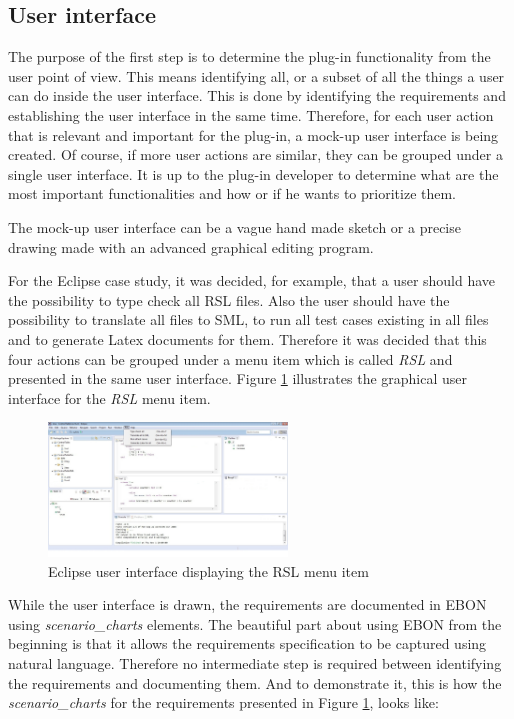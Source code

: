 \documentclass[conference]{IEEEtran}
\begin{document}
%
\subsection{User interface}

The purpose of the first step is to determine the plug-in
functionality from the user point of view. This means identifying all,
or a subset of all the things a user can do inside the user interface.
This is done by identifying the requirements and establishing the user
interface in the same time. Therefore, for each user action that is
relevant and important for the plug-in, a mock-up user interface is
being created. Of course, if more user actions are similar, they can
be grouped under a single user interface. It is up to the plug-in
developer to determine what are the most important functionalities and
how or if he wants to prioritize them.

The mock-up user interface can be a vague hand made sketch or a
precise drawing made with an advanced graphical editing program.

For the Eclipse case study, it was decided, for example, that a user
should have the possibility to type check all RSL files. Also the user
should have the possibility to translate all files to SML, to run all
test cases existing in all files and to generate Latex documents for
them. Therefore it was decided that this four actions can be grouped
under a menu item which is called \emph{RSL} and presented in the same
user interface. Figure \ref{UIMenu} illustrates the graphical user
interface for the \emph{RSL} menu item.

\begin{figure}[!t] \centering
\includegraphics[width=2.5in]{RSLMenu.jpeg} 
\caption{Eclipse user interface displaying the RSL menu item} 
\label{UIMenu} 
\end{figure}

While the user interface is drawn, the requirements are documented in
EBON using \emph{scenario\_charts} elements. The beautiful part about
using EBON from the beginning is that it allows the requirements
specification to be captured using natural language. Therefore no
intermediate step is required between identifying the requirements and
documenting them. And to demonstrate it, this is how the
\emph{scenario\_charts} for the requirements presented in Figure
\ref{UIMenu}, looks like:
\end{document}
